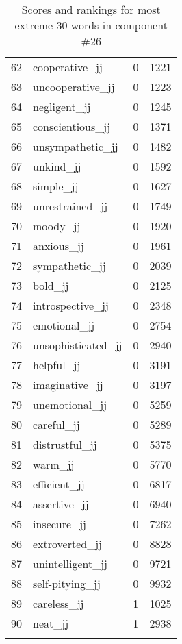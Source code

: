 \begin{longtable}[!htbp]{| rlr@{.}l |}
    62 & cooperative\_jj & 0 & 1221 \\
    63 & uncooperative\_jj & 0 & 1223 \\
    64 & negligent\_jj & 0 & 1245 \\
    65 & conscientious\_jj & 0 & 1371 \\
    66 & unsympathetic\_jj & 0 & 1482 \\
    67 & unkind\_jj & 0 & 1592 \\
    68 & simple\_jj & 0 & 1627 \\
    69 & unrestrained\_jj & 0 & 1749 \\
    70 & moody\_jj & 0 & 1920 \\
    71 & anxious\_jj & 0 & 1961 \\
    72 & sympathetic\_jj & 0 & 2039 \\
    73 & bold\_jj & 0 & 2125 \\
    74 & introspective\_jj & 0 & 2348 \\
    75 & emotional\_jj & 0 & 2754 \\
    76 & unsophisticated\_jj & 0 & 2940 \\
    77 & helpful\_jj & 0 & 3191 \\
    78 & imaginative\_jj & 0 & 3197 \\
    79 & unemotional\_jj & 0 & 5259 \\
    80 & careful\_jj & 0 & 5289 \\
    81 & distrustful\_jj & 0 & 5375 \\
    82 & warm\_jj & 0 & 5770 \\
    83 & efficient\_jj & 0 & 6817 \\
    84 & assertive\_jj & 0 & 6940 \\
    85 & insecure\_jj & 0 & 7262 \\
    86 & extroverted\_jj & 0 & 8828 \\
    87 & unintelligent\_jj & 0 & 9721 \\
    88 & self-pitying\_jj & 0 & 9932 \\
    89 & careless\_jj & 1 & 1025 \\
    90 & neat\_jj & 1 & 2938 \\
    \hline
    \caption{Scores and rankings for most extreme 30 words in component \#26} \\
\end{longtable}
